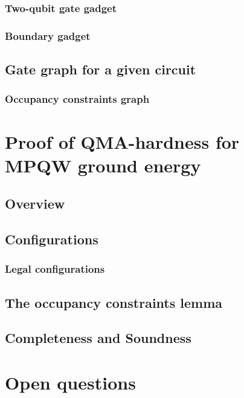 \documentclass[../thesis-main/thesis-main]{subfiles}
\begin{document}
\subsubsection{Two-qubit gate gadget}

\subsubsection{Boundary gadget}

\subsection{Gate graph for a given circuit}
\subsubsection{Occupancy constraints graph}

\section{Proof of QMA-hardness for MPQW ground energy}

\subsection{Overview}

\subsection{Configurations}

\subsubsection{Legal configurations}

\subsection{The occupancy constraints lemma}

\subsection{Completeness and Soundness}

\section{Open questions}
\end{document}
